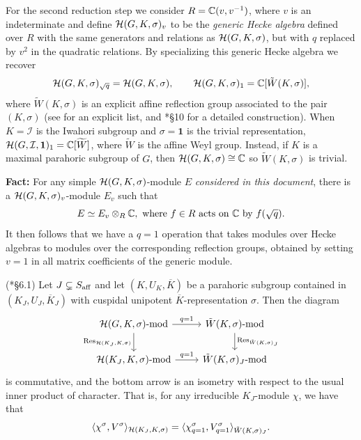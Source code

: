 For the second reduction step we consider $R=\mathbb{C}(v,v^{-1})$, where $v$ is an indeterminate and define $\mathcal{H}(G,K,\sigma)_v$ to be the \textit{generic Hecke algebra} defined over $R$ with the same generators and relations as $\mathcal{H}(G,K,\sigma)$, but with $q$ replaced by $v^2$ in the quadratic relations. By specializing this generic Hecke algebra we recover
$$\mathcal{H}(G,K,\sigma)_{\sqrt{q}}=\mathcal{H}(G,K,\sigma),\quad\quad \mathcal{H}(G,K,\sigma)_1=\mathbb{C}[\tilde{W}(K,\sigma)],$$
where $\tilde{W}(K,\sigma)$ is an explicit affine reflection group associated to the pair $(K,\sigma)$ (see \cite{Lusztig1995} for an explicit list, and \cite{Carter1985}*{\S10} for a detailed construction). When $K=\mathcal{I}$ is the Iwahori subgroup and $\sigma=\mathbf{1}$ is the trivial representation, $\mathcal{H}(G,\mathcal{I},\mathbf{1})_1=\mathbb{C}[\widetilde{W}]$, where $\widetilde{W}$ is the affine Weyl group. Instead, if $K$ is a maximal parahoric subgroup of $G$, then $\mathcal{H}(G,K,\sigma)\cong\mathbb{C}$ so $\tilde{W}(K,\sigma)$ is trivial.

\textbf{Fact:} For any simple $\mathcal{H}(G,K,\sigma)$-module $E$ \textit{considered in this document}, there is a $\mathcal{H}(G,K,\sigma)_v$-module $E_v$ such that 
\[
    E\simeq E_v\otimes_R\mathbb{C}, \text{ where }f\in R\text{ acts on $\mathbb{C}$ by }f(\sqrt{q}).
\]
It then follows that we have a $q=1$ operation that takes modules over Hecke algebras to modules over the corresponding reflection groups, obtained by setting $v=1$ in all matrix coefficients of the generic module.

\begin{proposition}\label{prop:second_red}(\cite{Reeder2000}*{\S6.1})
    Let $J\subsetneq S_{\mathrm{aff}}$ and let $(K,U_K,\overline{K})$ be a parahoric subgroup contained in $(K_J,U_J,\overline{K}_J)$ with cuspidal unipotent $\overline{K}$-representation $\sigma$. Then the diagram 
    \[
        \begin{tikzcd}
        \cH(G,K,\sigma)\textrm{-mod} \arrow[r, "q=1"] \arrow[d, "\Res_{\cH(K_J,K,\sigma)}"'] & \tilde{W}(K,\sigma)\textrm{-mod} \arrow[d, "\Res_{\tilde{W}(K,\sigma)_J}"] \\
        \cH(K_J,K,\sigma)\textrm{-mod} \arrow[r, "q=1"] & \tilde{W}(K,\sigma)_J\textrm{-mod}
        \end{tikzcd}
    \]
    is commutative, and the bottom arrow is an isometry with respect to the usual inner product of character. That is, for any irreducible $K_J$-module $\chi$, we have that 
    \begin{equation}
        \langle\chi^\sigma,V^\sigma\rangle_{\mathcal{H}(K_J,K,\sigma)}=\langle\chi^\sigma_{q=1},V^\sigma_{q=1}\rangle_{\tilde{W}(K,\sigma)_J}.
    \end{equation}
\end{proposition}

